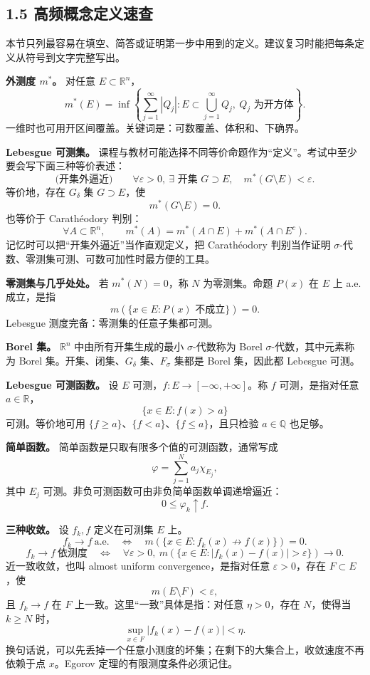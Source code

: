 \documentclass[
UTF8]{ctexart}
\newcommand{\impA}{\hspace{0.4em}{\small\textcolor{impAColor}{\textbf{[A 核心]}}}}
\newcommand{\impB}{\hspace{0.4em}{\small\textcolor{impBColor}{\textbf{[B 重要]}}}}
\begin{document}
\subsection{1.5 高频概念定义速查}\label{ux9ad8ux9891ux6982ux5ff5ux5b9aux4e49ux901fux67e5}

本节只列最容易在填空、简答或证明第一步中用到的定义。建议复习时能把每条定义从符号到文字完整写出。

\textbf{外测度 \(m^*\)。}\impA
对任意 \(E\subset\mathbb R^n\)，
\[
  m^*(E)=\inf\left\{\sum_{j=1}^{\infty}|Q_j|:
  E\subset\bigcup_{j=1}^{\infty}Q_j,\ Q_j\text{ 为开方体}\right\}.
\]
一维时也可用开区间覆盖。关键词是：可数覆盖、体积和、下确界。

\textbf{Lebesgue 可测集。}\impA
课程与教材可能选择不同等价命题作为“定义”。考试中至少要会写下面三种等价表述：
\[
  \text{(开集外逼近)}\qquad
  \forall \varepsilon>0,\ \exists\text{ 开集 }G\supset E,\quad
  m^*(G\setminus E)<\varepsilon.
\]
等价地，存在 \(G_\delta\) 集 \(G\supset E\)，使
\[
  m^*(G\setminus E)=0.
\]
也等价于 Carathéodory 判别：
\[
  \forall A\subset\mathbb R^n,\qquad
  m^*(A)=m^*(A\cap E)+m^*(A\cap E^c).
\]
记忆时可以把“开集外逼近”当作直观定义，把 Carathéodory 判别当作证明
\(\sigma\)-代数、零测集可测、可数可加性时最方便的工具。

\textbf{零测集与几乎处处。}\impA
若 \(m^*(N)=0\)，称 \(N\) 为零测集。命题 \(P(x)\) 在 \(E\) 上 a.e. 成立，是指
\[
  m(\{x\in E:P(x)\text{ 不成立}\})=0.
\]
Lebesgue 测度完备：零测集的任意子集都可测。

\textbf{Borel 集。}\impB
\(\mathbb R^n\) 中由所有开集生成的最小 \(\sigma\)-代数称为 Borel
\(\sigma\)-代数，其中元素称为 Borel 集。开集、闭集、\(G_\delta\) 集、\(F_\sigma\) 集都是 Borel 集，因此都 Lebesgue 可测。

\textbf{Lebesgue 可测函数。}\impA
设 \(E\) 可测，\(f:E\to[-\infty,+\infty]\)。称 \(f\) 可测，是指对任意
\(a\in\mathbb R\)，
\[
  \{x\in E:f(x)>a\}
\]
可测。等价地可用 \(\{f\ge a\}\)、\(\{f<a\}\)、\(\{f\le a\}\)，且只检验
\(a\in\mathbb Q\) 也足够。

\textbf{简单函数。}\impA
简单函数是只取有限多个值的可测函数，通常写成
\[
  \varphi=\sum_{j=1}^N a_j\chi_{E_j},
\]
其中 \(E_j\) 可测。非负可测函数可由非负简单函数单调递增逼近：
\[
  0\le \varphi_k\uparrow f.
\]

\textbf{三种收敛。}\impA
设 \(f_k,f\) 定义在可测集 \(E\) 上。
\[
  f_k\to f\ \text{a.e.}
  \quad\Longleftrightarrow\quad
  m(\{x\in E:f_k(x)\not\to f(x)\})=0.
\]
\[
  f_k\to f\ \text{依测度}
  \quad\Longleftrightarrow\quad
  \forall \varepsilon>0,\ 
  m(\{x\in E:|f_k(x)-f(x)|>\varepsilon\})\to0.
\]
近一致收敛，也叫 almost uniform convergence，是指对任意 \(\varepsilon>0\)，存在
\(F\subset E\)，使
\[
  m(E\setminus F)<\varepsilon,
\]
且 \(f_k\to f\) 在 \(F\) 上一致。这里“一致”具体是指：对任意
\(\eta>0\)，存在 \(N\)，使得当 \(k\ge N\) 时，
\[
  \sup_{x\in F}|f_k(x)-f(x)|<\eta.
\]
换句话说，可以先丢掉一个任意小测度的坏集；在剩下的大集合上，收敛速度不再依赖于点
\(x\)。Egorov 定理的有限测度条件必须记住。
\end{document}
